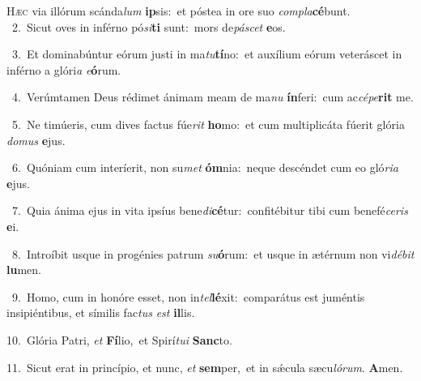 \lettrine{\initial\textcolor{\initialcolor}{H}}{æc} via illórum scánda\textit{lum} \textbf{ip}\-sis:~\star et póstea in ore suo \textit{com}\-\textit{pla}\textbf{cé}bunt.\\
{\numbfont\textcolor{\numbcolor}{~2.}}~Sicut oves in inférno pó\-\textit{si}\-\textbf{ti} sunt:~\star mors de\-\textit{pá}\-\textit{scet} \textbf{e}\-os.\par
{\numbfont\textcolor{\numbcolor}{~3.}}~Et dominabúntur eórum justi in ma\-\textit{tu}\-\textbf{tí}no:~\star et auxílium eórum veteráscet in inférno a glóri\textit{a} \textit{e}\-\textbf{ó}rum.\par
{\numbfont\textcolor{\numbcolor}{~4.}}~Verúmtamen Deus rédimet ánimam meam de ma\textit{nu} \textbf{ín}\-feri:~\star cum ac\-\textit{cé}\-\textit{pe}\textbf{rit} me.\par
{\numbfont\textcolor{\numbcolor}{~5.}}~Ne timúeris, cum dives factus fúe\textit{rit} \textbf{ho}\-mo:~\star et cum multiplicáta fúerit glória \textit{do}\-\textit{mus} \textbf{e}\-jus.\par
{\numbfont\textcolor{\numbcolor}{~6.}}~Quóniam cum interíerit, non su\textit{met} \textbf{óm}\-nia:~\star neque descéndet cum eo gló\-\textit{ri}\-\textit{a} \textbf{e}\-jus.\par
{\numbfont\textcolor{\numbcolor}{~7.}}~Quia ánima ejus in vita ipsíus bene\-\textit{di}\-\textbf{cé}tur:~\star confitébitur tibi cum benefé\-\textit{ce}\-\textit{ris} \textbf{e}\-i.\par
{\numbfont\textcolor{\numbcolor}{~8.}}~Introíbit usque in progénies patrum \textit{su}\-\textbf{ó}rum:~\star et usque in ætérnum non vi\-\textit{dé}\-\textit{bit} \textbf{lu}\-men.\par
{\numbfont\textcolor{\numbcolor}{~9.}}~Homo, cum in honóre esset, non in\-\textit{tel}\-\textbf{lé}xit:~\star comparátus est juméntis insipiéntibus, et símilis fac\textit{tus} \textit{est} \textbf{il}\-lis.\par
{\numbfont\textcolor{\numbcolor}{10.}}~Glória Patri, \textit{et} \textbf{Fí}\-lio,~\star et Spirí\-\textit{tu}\-\textit{i} \textbf{Sanc}\-to.\par
{\numbfont\textcolor{\numbcolor}{11.}}~Sicut erat in princípio, et nunc, \textit{et} \textbf{sem}\-per,~\star et in sǽcula sæcu\-\textit{ló}\-\textit{rum}. \textbf{A}\-men.\par
